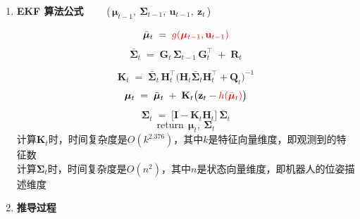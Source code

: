 \documentclass[../main.tex]{subfiles}
\begin{document}
\begin{enumerate}
        
  \item \textbf{EKF 算法公式} \ \ \ \ (\,$\boldsymbol{\mu}_{t-1},\ \boldsymbol{\Sigma}_{t-1},\ \mathbf{u}_{t-1},\ \mathbf{z}_t$\,)
  
  $$
  \bar{\boldsymbol{\mu}}_t \;=\; \textcolor{red}{g(\boldsymbol{\mu}_{t-1},\mathbf{u}_{t-1})}
  $$
  $$
  \bar{\boldsymbol{\Sigma}}_t \;=\; \mathbf{G}_t\,\boldsymbol{\Sigma}_{t-1}\,\mathbf{G}_t^\top \;+\; \mathbf{R}_t
  $$
  
  $$
  \mathbf{K}_t \;=\; \bar{\boldsymbol{\Sigma}}_t \,\mathbf{H}_t^\top \big(\mathbf{H}_t \bar{\boldsymbol{\Sigma}}_t \mathbf{H}_t^\top + \mathbf{Q}_t\big)^{-1}
  $$
  $$
  \boldsymbol{\mu}_t \;=\; \bar{\boldsymbol{\mu}}_t \;+\; \mathbf{K}_t\big(\mathbf{z}_t - \textcolor{red}{h(\bar{\boldsymbol{\mu}}_t)}\big)
  $$
  $$
  \boldsymbol{\Sigma}_t \;=\; \big[\mathbf{I} - \mathbf{K}_t \mathbf{H}_t\big]\ \bar{\boldsymbol{\Sigma}}_t
  $$
  $$
  \text{return}\ \ \boldsymbol{\mu}_t,\ \boldsymbol{\Sigma}_t
  $$
          计算$\mathbf{K}_t$时，时间复杂度是$O(k^{2.376})$，其中$k$是特征向量维度，即观测到的特征数\\
          计算$\boldsymbol{\Sigma}_t$时，时间复杂度是$O(n^2)$，其中$n$是状态向量维度，即机器人的位姿描述维度
  \item \textbf{推导过程}\label{ekf_process}
  
  {\small{}}
\end{enumerate}
\end{document}
